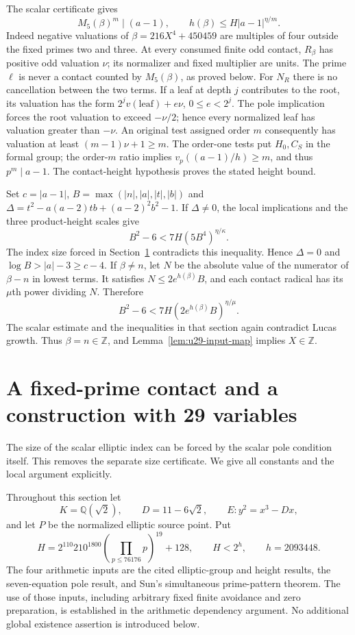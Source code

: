 \documentclass[11pt,a4paper]{article}
\theoremstyle{definition}
\theoremstyle{remark}
\begin{document}
The scalar certificate gives
\[
                 M_5(\beta)^m\mid(a-1),\qquad
                 h(\beta)\le H|a-1|^{\eta/m}.
\]
Indeed negative valuations of $\beta=216X^4+450459$
are multiples of four outside the fixed primes two and three.
At every consumed finite odd contact, $R_\beta$ has positive odd
valuation $\nu$; its normalizer and fixed multiplier are units. The prime
$\ell$ is never a contact counted by $M_5(\beta)$, as proved below.
For $N_R$ there is no cancellation between the two terms.  If a leaf
at depth $j$ contributes to the root, its valuation has the form
$2^jv(\text{leaf})+e\nu$, $0\le e<2^j$.
The pole implication forces the root valuation to exceed $-\nu/2$;
hence every normalized leaf has valuation greater than $-\nu$.
An original test assigned order $m$ consequently has valuation
at least $(m-1)\nu+1\ge m$.  The order-one tests put $H_0,C_S$
in the formal group; the order-$m$ ratio implies
$v_p((a-1)/h)\ge m$, and thus $p^m\mid a-1$.
The contact-height hypothesis proves the stated height bound.

Set $c=|a-1|$, $B=\max(|n|,|a|,|t|,|b|)$ and
$\Delta=t^2-a(a-2)tb+(a-2)^2b^2-1$.
If $\Delta\ne0$, the local implications and the three product-height
scales give
\[
                    B^2-6<7H(5B^4)^{\eta/\kappa}.
\]
The index size forced in Section~\ref{sec:fixed-prime-contact}
contradicts this inequality.  Hence $\Delta=0$
and $\log B>|a|-3\ge c-4$.
If $\beta\ne n$, let $N$ be the absolute value of the numerator of
$\beta-n$ in lowest terms.  It satisfies
$N\le2e^{h(\beta)}B$, and each contact radical has its $\mu$th power
dividing $N$.  Therefore
\[
                   B^2-6<7H(2e^{h(\beta)}B)^{\eta/\mu}.
\]
The scalar estimate and the inequalities in that section again contradict
Lucas growth.  Thus $\beta=n\in\mathbb Z$, and
Lemma~\ref{lem:u29-input-map} implies $X\in\mathbb Z$.

\section{A fixed-prime contact and a construction with 29 variables}
\label{sec:fixed-prime-contact}

The size of the scalar elliptic index can be forced by the scalar pole
condition itself. This removes the separate size certificate. We give
all constants and the local argument explicitly.

Throughout this section let
\[
 K=\mathbb Q(\sqrt2),\qquad D=11-6\sqrt2,\qquad
 E:y^2=x^3-Dx,
\]
and let $P$ be the normalized elliptic source point. Put
\[
 H=2^{110}210^{1800}\left(\prod_{p\le76176}p\right)^{19}+128,
 \qquad H<2^h,\qquad h=2093448.
\]
The four arithmetic inputs are the cited elliptic-group and height
results, the seven-equation pole result, and Sun's simultaneous
prime-pattern theorem. The use of those inputs, including arbitrary
fixed finite avoidance and zero preparation, is established in the
arithmetic dependency argument. No additional global existence
assertion is introduced below.
\end{document}
